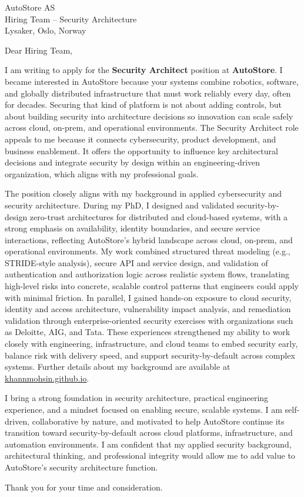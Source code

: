 AutoStore AS\\
Hiring Team – Security Architecture\\
Lysaker, Oslo, Norway

Dear Hiring Team,

I am writing to apply for the \textbf{Security Architect} position at \textbf{AutoStore}.
%
I became interested in AutoStore because your systems combine robotics, software, and globally distributed infrastructure that must work reliably every day, often for decades. Securing that kind of platform is not about adding controls, but about building security into architecture decisions so innovation can scale safely across cloud, on-prem, and operational environments. The Security Architect role appeals to me because it connects cybersecurity, product development, and business enablement. It offers the opportunity to influence key architectural decisions and integrate security by design within an engineering-driven organization, which aligns with my professional goals.

The position closely aligns with my background in applied cybersecurity and security architecture. During my PhD, I designed and validated security-by-design zero-trust architectures for distributed and cloud-based systems, with a strong emphasis on availability, identity boundaries, and secure service interactions, reflecting AutoStore’s hybrid landscape across cloud, on-prem, and operational environments. My work combined structured threat modeling (e.g., STRIDE-style analysis), secure API and service design, and validation of authentication and authorization logic across realistic system flows, translating high-level risks into concrete, scalable control patterns that engineers could apply with minimal friction. In parallel, I gained hands-on exposure to cloud security, identity and access architecture, vulnerability impact analysis, and remediation validation through enterprise-oriented security exercises with organizations such as Deloitte, AIG, and Tata. These experiences strengthened my ability to work closely with engineering, infrastructure, and cloud teams to embed security early, balance risk with delivery speed, and support security-by-default across complex systems. Further details about my background are available at \href{https://khannmohsin.github.io}{\underline{khannmohsin.github.io}}.

I bring a strong foundation in security architecture, practical engineering experience, and a mindset focused on enabling secure, scalable systems. I am self-driven, collaborative by nature, and motivated to help AutoStore continue its transition toward security-by-default across cloud platforms, infrastructure, and automation environments. I am confident that my applied security background, architectural thinking, and professional integrity would allow me to add value to AutoStore’s security architecture function.

Thank you for your time and consideration.